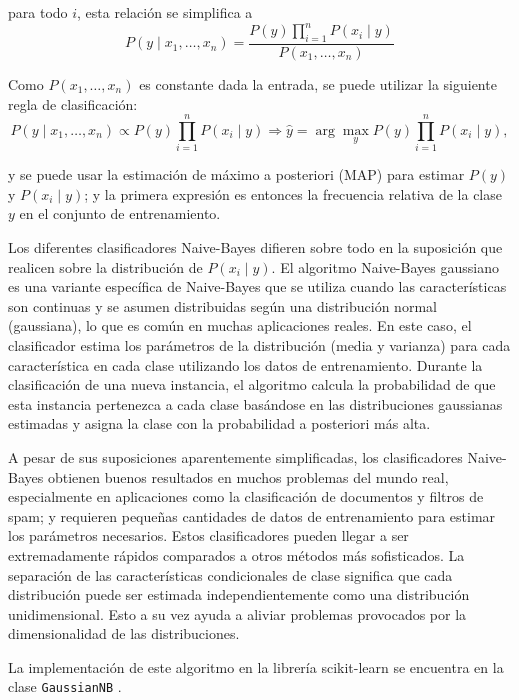 para todo $i$, esta relación se simplifica a 
\begin{equation*}
    P(y\mid x_{1},\dots,x_{n})=\dfrac{P(y) \prod^{n}_{i=1} P(x_{i}\mid y)}{P(x_{1},\dots,x_{n})}
\end{equation*}

Como $P(x_{1},\dots,x_{n})$ es constante dada la entrada, se puede utilizar la siguiente regla de clasificación:
\begin{equation*}
    P(y\mid x_{1},\dots,x_{n}) \propto P(y) \prod^{n}_{i=1}P(x_{i}\mid y) \Rightarrow 
    \hat{y} = \arg \max_{y} P(y) \prod^{n}_{i=1}P(x_{i}\mid y),
\end{equation*}

y se puede usar la estimación de máximo a posteriori (MAP) para estimar $P(y)$ y $P(x_{i}\mid y)$; y la primera expresión es entonces la frecuencia relativa de la clase $y$ en el conjunto de entrenamiento.

Los diferentes clasificadores Naive-Bayes difieren sobre todo en la suposición que realicen sobre la distribución de $P(x_{i} \mid y)$. El algoritmo Naive-Bayes gaussiano es una variante específica de Naive-Bayes que se utiliza cuando las características son continuas y se asumen distribuidas según una distribución normal (gaussiana), lo que es común en muchas aplicaciones reales. En este caso, el clasificador estima los parámetros de la distribución (media y varianza) para cada característica en cada clase utilizando los datos de entrenamiento. Durante la clasificación de una nueva instancia, el algoritmo calcula la probabilidad de que esta instancia pertenezca a cada clase basándose en las distribuciones gaussianas estimadas y asigna la clase con la probabilidad a posteriori más alta.

A pesar de sus suposiciones aparentemente simplificadas, los clasificadores Naive-Bayes obtienen buenos resultados en muchos problemas del mundo real, especialmente en aplicaciones como la clasificación de documentos y filtros de spam; y requieren pequeñas cantidades de datos de entrenamiento para estimar los parámetros necesarios. Estos clasificadores pueden llegar a ser extremadamente rápidos comparados a otros métodos más sofisticados. La separación de las características condicionales de clase significa que cada distribución puede ser estimada independientemente como una distribución unidimensional. Esto a su vez ayuda a aliviar problemas provocados por la dimensionalidad de las distribuciones.

La implementación de este algoritmo en la librería scikit-learn se encuentra en la clase \texttt{GaussianNB} \cite{sk-nb-gaussian}.

